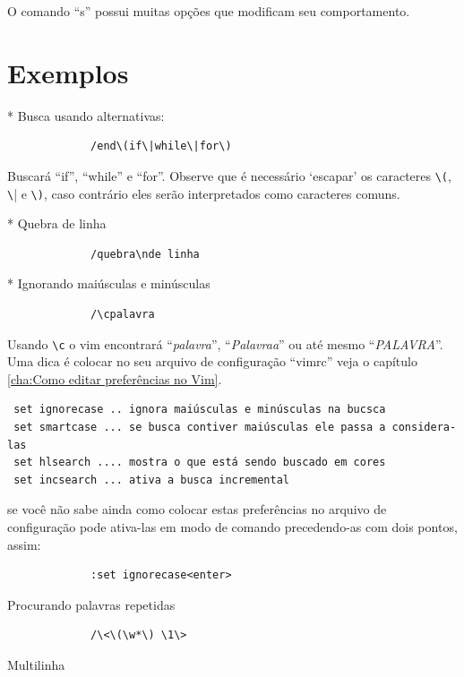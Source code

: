 \documentclass[10pt,a4paper,openany]{book}
\begin{document}
O comando ``s'' possui muitas opções que modificam seu comportamento.

\section{Exemplos }
\label{Exemplos }

* Busca usando alternativas:

\begin{verbatim}
			 /end\(if\|while\|for\)
\end{verbatim}

Buscará ``if'', ``while'' e ``for''.  Observe que é necessário `escapar' os
caracteres \verb|\(|, \verb|\|| e \verb|\)|, caso contrário eles serão
interpretados como caracteres comuns.

* Quebra de linha

\begin{verbatim}
			 /quebra\nde linha
\end{verbatim}

* Ignorando maiúsculas e minúsculas

\begin{verbatim}
			 /\cpalavra
\end{verbatim}

Usando \verb|\c| o vim encontrará ``{\em{palavra}}'', ``{\em{Palavraa}}'' ou
até mesmo ``{\em{PALAVRA}}''. Uma dica é colocar no seu arquivo de
configuração ``vimrc'' veja o capítulo \ref{cha:Como editar preferências no Vim}.

\begin{verbatim}
 set ignorecase .. ignora maiúsculas e minúsculas na bucsca
 set smartcase ... se busca contiver maiúsculas ele passa a considera-las
 set hlsearch .... mostra o que está sendo buscado em cores
 set incsearch ... ativa a busca incremental
\end{verbatim}

se você não sabe ainda como colocar estas preferências no arquivo de configuração pode
ativa-las em modo de comando precedendo-as com dois pontos, assim:

\begin{verbatim}
			 :set ignorecase<enter>
\end{verbatim}

Procurando palavras repetidas

\begin{verbatim}
			 /\<\(\w*\) \1\>
\end{verbatim}

Multilinha
\end{document}
